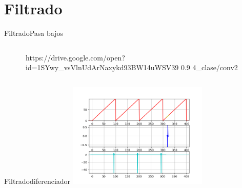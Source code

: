 \section{Filtrado}
\begin{frame}{Filtrado}{Pasa bajos}
   \begin{columns}[c]
      \hspace{5pt}
      \begin{column}{.3\textwidth}
         
      \end{column}
      \hspace{2pt}
      \vrule
      \hspace{2pt}
      \begin{column}{.3\textwidth}
         
      \end{column}
      \hspace{2pt}
      \vrule
      \hspace{2pt}
      \begin{column}{.38\textwidth}
         {https://drive.google.com/open?id=1SYwy_vsVlnUdArNaxykd93BW14uWSV39}
         {0.9}
         {4_clase/conv2}
      \end{column}
      \hspace{2pt}
   \end{columns}
   \vfill
\end{frame}
\begin{frame}{Filtrado}{diferenciador}
         \centering\includegraphics[width=0.5\textwidth]{4_clase/diferenciador}
   \vfill
\end{frame}
